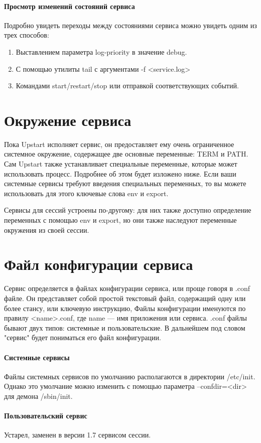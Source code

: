 \paragraph{Просмотр изменений состояний сервиса}
Подробно увидеть переходы между состояниями сервиса можно увидеть одним из трех способов: \begin{enumerate}
\item Выставлением параметра log-priority в значение debug.
\item С помощью утилиты tail с аргументами -f <service.log>
\item Командами start/restart/stop или отправкой соответствующих событий.
\end{enumerate}
\section{Окружение сервиса}
Пока Upstart исполняет сервис, он предоставляет ему очень ограниченное системное окружение, 
содержащее две основные переменные: TERM и PATH. Сам Upstart также устанавливает специальные переменные, которые может использовать процесс. Подробнее об этом будет изложено ниже. Если ваши системные сервисы 
требуют введения специальных переменных, то вы можете использовать для этого ключевые слова env и export.

Сервисы для сессий устроены по-другому: для них также доступно определение переменных с помощью env и export, но они также наследуют переменные окружения из своей сессии.
\section{Файл конфигурации сервиса}
Сервис определяется в файлах конфигурации сервиса, или проще говоря в .conf файле. Он представляет собой простой текстовый файл, содержащий одну или более стансу, или ключевую инструкцию, Файлы конфигурации именуются по правилу <name>.conf, где  name --- имя приложения или сервиса. .conf файлы бывают двух типов: 
системные и пользовательские. В дальнейшем под словом "сервис" будет пониматься его файл конфигурации.
\paragraph{Системные сервисы}
Файлы системных сервисов по умолчанию располагаются в директории /etc/init. Однако это умолчание можно изменить с помощью параметра --confdir=<dir> для демона /sbin/init. 
\paragraph{Пользовательский сервис}
Устарел, заменен в версии 1.7 сервисом сессии.

